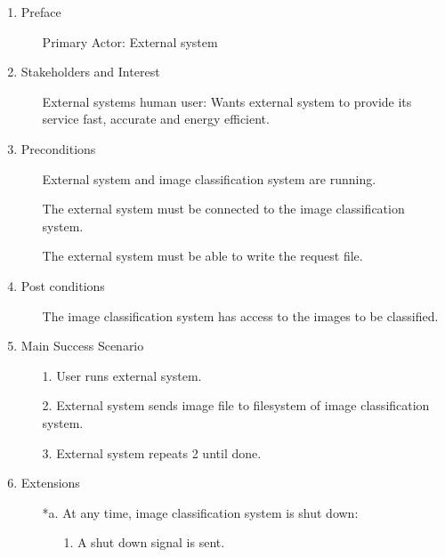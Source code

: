\documentclass[parskip=full]{scrartcl}
\begin{document}
\begin{enumerate}
	\item Preface
	\begin{itemize} [nosep]
		\item[] Primary Actor: External system
	\end{itemize}
	\item Stakeholders and Interest
	\begin{itemize} [nosep]
		\item[] External systems human user: Wants external system to provide its service fast, accurate and energy efficient.
	\end{itemize}
	\item Preconditions
	\begin{itemize} [nosep]
		\item[] External system and image classification system are running.
		\item[] The external system must be connected to the image classification system.
		\item[] The external system must be able to write the request file.
	\end{itemize}
	\item Post conditions
	\begin{itemize} [nosep]
		\item[] The image classification system has access to the images to be classified.
	\end{itemize}
	\item Main Success Scenario
	\begin{itemize} [nosep]
		\item[1.] User runs external system.
		\item[2.] External system sends image file to filesystem of image classification system.
		\item[3.] External system repeats 2 until done.
	\end{itemize}
	\item Extensions
	\begin{itemize} [nosep]
		\item[*a.] At any time, image classification system is shut down:
		\begin{itemize} [nosep]
			\item[1.] A shut down signal is sent.
		\end{itemize}
	\end{itemize}
\end{enumerate}

\pagebreak
\end{document}
